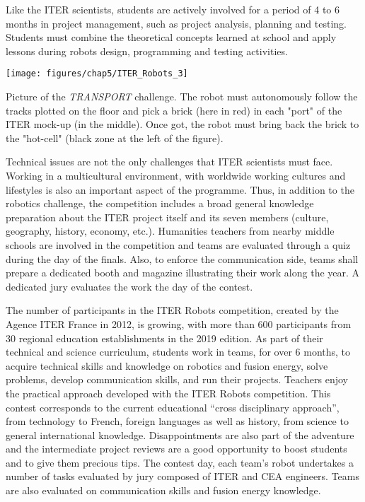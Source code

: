 Like the ITER scientists, students are actively involved for a period of 4 to 6 months in project management, such as project analysis, planning and testing. Students must combine the theoretical concepts learned at school and apply lessons during robots design, programming and testing activities. 

\begin{marginfigure}
	\centering
	\texttt{[image: figures/chap5/ITER\_Robots\_3]}
	\caption{Picture of the \textit{TRANSPORT} challenge. The robot must autonomously follow the tracks plotted on the floor and pick a brick (here in red) in each "port" of the ITER mock-up (in the middle). Once got, the robot must bring back the brick to the "hot-cell" (black zone at the left of the figure).}
	\label{fig:iterrobots3}
\end{marginfigure}

Technical issues are not the only challenges that ITER scientists must face. Working in a multicultural environment, with worldwide working cultures and lifestyles is also an important aspect of the programme. Thus, in addition to the robotics challenge, the competition includes a broad general knowledge preparation about the ITER project itself and its seven members (culture, geography, history, economy, etc.). Humanities teachers from nearby middle schools are involved in the competition and teams are evaluated through a quiz during the day of the finals. Also, to enforce the communication side, teams shall prepare a dedicated booth and magazine illustrating their work along the year. A dedicated jury evaluates the work the day of the contest.


The number of participants in the ITER Robots competition, created by the Agence ITER France in 2012, is growing, with more than 600 participants from 30 regional education establishments in the 2019 edition. As part of their technical and science curriculum, students work in teams, for over 6 months, to acquire technical skills and knowledge on robotics and fusion energy, solve problems, develop communication skills, and run their projects. Teachers enjoy the practical approach developed with the ITER Robots competition. This contest corresponds to the current educational “cross disciplinary approach”, from technology to French, foreign languages as well as history, from science to general international knowledge. Disappointments are also part of the adventure and the intermediate project reviews are a good opportunity to boost students and to give them precious tips. The contest day, each team's robot undertakes a number of tasks evaluated by jury composed of ITER and CEA engineers. Teams are also evaluated on communication skills and fusion energy knowledge. 


